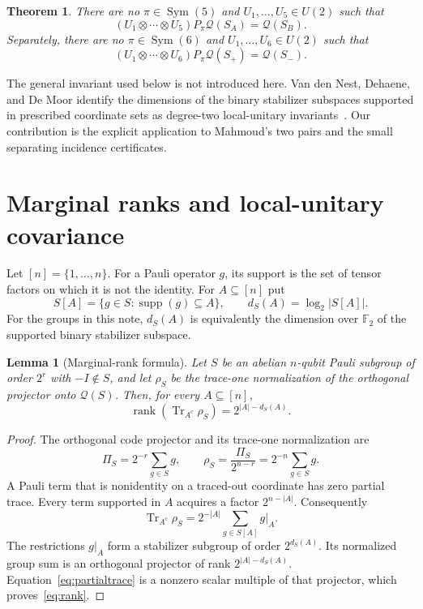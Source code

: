 \documentclass[11pt]{article}
\newtheorem{theorem}{Theorem}
\newtheorem{lemma}{Lemma}
\DeclareMathOperator{\rank}{rank}
\DeclareMathOperator{\Tr}{Tr}
\newcommand{\supp}{\operatorname{supp}}
\newcommand{\cQ}{\mathcal Q}
\begin{document}
\begin{theorem}\label{thm:main}
There are no $\pi\in\operatorname{Sym}(5)$ and $U_1,\ldots,U_5\in U(2)$
such that
\[
 (U_1\otimes\cdots\otimes U_5)P_\pi\cQ(S_A)=\cQ(S_B).
\]
Separately, there are no $\pi\in\operatorname{Sym}(6)$ and
$U_1,\ldots,U_6\in U(2)$ such that
\[
 (U_1\otimes\cdots\otimes U_6)P_\pi\cQ(S_+)=\cQ(S_-).
\]
\end{theorem}

The general invariant used below is not introduced here.  Van den Nest,
Dehaene, and De Moor identify the dimensions of the binary stabilizer
subspaces supported in prescribed coordinate sets as degree-two
local-unitary invariants~\cite[Eq.~(14)]{VanDenNestEtAl2004}.  Our
contribution is the explicit application to Mahmoud's two pairs and the
small separating incidence certificates.

\section{Marginal ranks and local-unitary covariance}

Let $[n]=\{1,\ldots,n\}$.  For a Pauli operator $g$, its support is the set
of tensor factors on which it is not the identity.  For $A\subseteq[n]$ put
\[
 S[A]=\{g\in S:\supp(g)\subseteq A\},\qquad
 d_S(A)=\log_2|S[A]|.
\]
For the groups in this note, $d_S(A)$ is equivalently the dimension over
$\mathbb F_2$ of the supported binary stabilizer subspace.

\begin{lemma}[Marginal-rank formula]\label{lem:rank}
Let $S$ be an abelian $n$-qubit Pauli subgroup of order $2^r$ with
$-I\notin S$, and let $\rho_S$ be the trace-one normalization of the
orthogonal projector onto $\cQ(S)$.  Then, for every $A\subseteq[n]$,
\begin{equation}\label{eq:rank}
 \rank\!\left(\Tr_{A^c}\rho_S\right)=2^{|A|-d_S(A)}.
\end{equation}
\end{lemma}

\begin{proof}
The orthogonal code projector and its trace-one normalization are
\[
 \Pi_S=2^{-r}\sum_{g\in S}g,
 \qquad
 \rho_S=\frac{\Pi_S}{2^{n-r}}=2^{-n}\sum_{g\in S}g.
\]
A Pauli term that is nonidentity on a traced-out coordinate has zero partial
trace.  Every term supported in $A$ acquires a factor $2^{n-|A|}$.
Consequently
\begin{equation}\label{eq:partialtrace}
 \Tr_{A^c}\rho_S
 =2^{-|A|}\sum_{g\in S[A]}g|_A.
\end{equation}
The restrictions $g|_A$ form a stabilizer subgroup of order
$2^{d_S(A)}$.  Its normalized group sum is an orthogonal projector of rank
$2^{|A|-d_S(A)}$.  Equation~\eqref{eq:partialtrace} is a nonzero scalar
multiple of that projector, which proves~\eqref{eq:rank}.
\end{proof}
\end{document}
